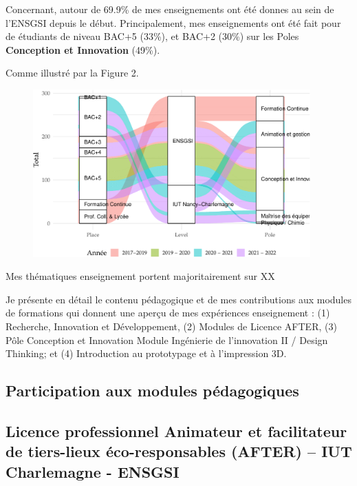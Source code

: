 \documentclass[
  11pt,
]{article}
\begin{document}
Concernant, autour de 69.9\% de mes enseignements ont été donnes au sein
de l'ENSGSI depuis le début. Principalement, mes enseignements ont été
fait pour de étudiants de niveau BAC+5 (33\%), et BAC+2 (30\%) sur les
Poles \textbf{Conception et Innovation} (49\%).

Comme illustré par la Figure 2.

\begin{figure}[H]

{\centering \includegraphics[width=0.95\textwidth,height=\textheight]{Figures/unnamed-chunk-3-1.pdf}

}

\end{figure}

Mes thématiques enseignement portent majoritairement sur XX

Je présente en détail le contenu pédagogique et de mes contributions aux
modules de formations qui donnent une aperçu de mes expériences
enseignement : (1) Recherche, Innovation et Développement, (2) Modules
de Licence AFTER, (3) Pôle Conception et Innovation Module Ingénierie de
l'innovation II / Design Thinking; et (4) Introduction au prototypage et
à l'impression 3D.

\hypertarget{participation-aux-modules-puxe9dagogiques}{%
\subsection{Participation aux modules
pédagogiques}\label{participation-aux-modules-puxe9dagogiques}}

\hypertarget{licence-professionnel-animateur-et-facilitateur-de-tiers-lieux-uxe9co-responsables-after-iut-charlemagne---ensgsi}{%
\subsection{Licence professionnel Animateur et facilitateur de
tiers-lieux éco-responsables (AFTER) -- IUT Charlemagne -
ENSGSI}\label{licence-professionnel-animateur-et-facilitateur-de-tiers-lieux-uxe9co-responsables-after-iut-charlemagne---ensgsi}}
\end{document}
